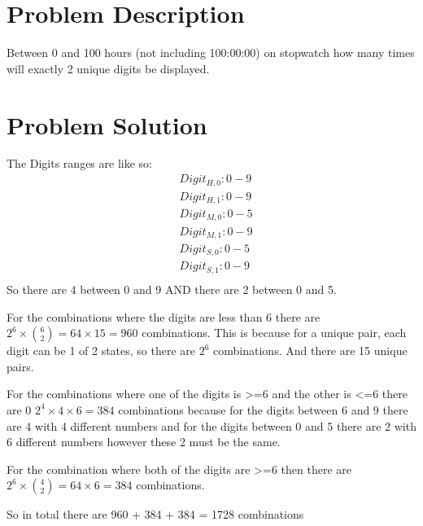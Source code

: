 \documentclass{article}
\begin{document}
\section{Problem Description}
\huge
Between 0 and 100 hours (not including 100:00:00) on 
stopwatch how many times will exactly 2 unique digits 
be displayed.
\section{Problem Solution}

The Digits ranges are like so:
\begin{align*}
    &Digit_{H,0}: {0-9}\\
    &Digit_{H,1}: {0-9}\\
    &Digit_{M,0}: {0-5}\\
    &Digit_{M,1}: {0-9}\\
    &Digit_{S,0}: {0-5}\\
    &Digit_{S,1}: {0-9}\\
\end{align*}
So there are 4 between 0 and 9 AND there are 2 between 0 and 5.

For the combinations where the digits are less than 6 there are
$2^6 \times \binom{6}{2} = 64 \times 15 = 960$ combinations. 
This is because for a unique pair, each digit can be 1 of 2
states, so there are $2^6$ combinations. And there are 15 
unique pairs.

For the combinations where one of the digits is >=6 and the
other is <=6 there are 0
$2^4 \times 4 \times 6 = 384$ combinations because for the
digits between 6 and 9 there are 4 with 4 different numbers and
for the digits between 0 and 5 there are 2 with 6 different
numbers however these 2 must be the same.

For the combination where both of the digits are >=6 then
there are $2^6 \times \binom{4}{2} = 64 \times 6 = 384$
combinations.

So in total there are 960 + 384 + 384 = 1728 combinations
\end{document}
